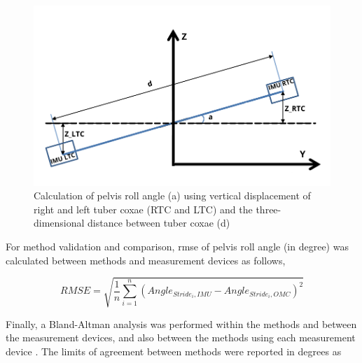 \begin{figure}[htbp]
\centering
\includegraphics[width=.75\linewidth]{chapters/Pelvis/figures/Z_RTC (1).png}
\caption{Calculation of pelvis roll angle (a) using vertical displacement of right and left tuber coxae (RTC and LTC) and the three-dimensional distance between tuber coxae (d)}
\label{pfau}
\end{figure}

For method validation and comparison, \gls{rmse} of pelvis roll angle (in degree) was calculated between methods and measurement devices as follows,

\begin{equation}
RMSE = \sqrt{\frac{1}{n} \sum_{i=1}^{n} (Angle_{Stride_i,IMU} - Angle_{Stride_i,OMC})^2}
\end{equation}

Finally, a Bland-Altman analysis was performed within the methods and between the measurement devices, and also between the methods using each measurement device \cite{456}. The limits of agreement between methods were reported in degrees as 

\begin{equation}
[\text{bias}, 2\times \text{standard deviation}]
\end{equation}

